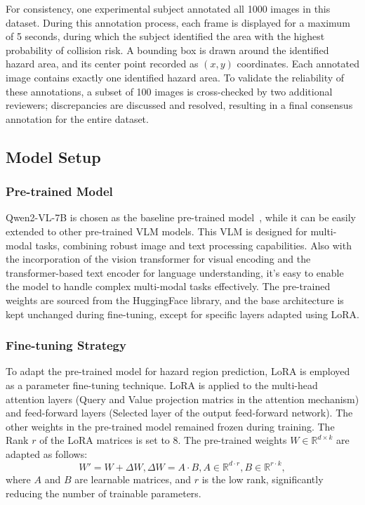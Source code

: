 For consistency, one experimental subject annotated all 1000 images in this dataset. During this annotation process, each frame is displayed for a maximum of 5 seconds, during which the subject identified the area with the highest probability of collision risk. A bounding box is drawn around the identified hazard area, and its center point recorded as $(x, y)$ coordinates. Each annotated image contains exactly one identified hazard area. To validate the reliability of these annotations, a subset of 100 images is cross-checked by two additional reviewers; discrepancies are discussed and resolved, resulting in a final consensus annotation for the entire dataset.

% 



\subsection{Model Setup} 
\subsubsection{Pre-trained Model}
Qwen2-VL-7B is chosen as the baseline pre-trained model~\cite{wang2024qwen2}, while it can be easily extended to other pre-trained VLM models. This VLM is designed for multi-modal tasks, combining robust image and text processing capabilities. Also with the incorporation of the vision transformer for visual encoding and the transformer-based text encoder for language understanding, it's easy to enable the model to handle complex multi-modal tasks effectively. The pre-trained weights are sourced from the HuggingFace library, and the base architecture is kept unchanged during fine-tuning, except for specific layers adapted using LoRA.
\subsubsection{Fine-tuning Strategy}
To adapt the pre-trained model for hazard region prediction, LoRA is employed as a parameter fine-tuning technique. LoRA is applied to the multi-head attention layers (Query and Value projection matrics in the attention mechanism) and feed-forward layers (Selected layer of the output feed-forward network). The other weights in the pre-trained model remained frozen during training. The Rank $r$ of the LoRA matrices is set to 8. The pre-trained weights $W \in \mathbb{R}^{d \times k}$ are adapted as follows:
\begin{equation}
    W' = W + \Delta W, \Delta W = A \cdot B, A \in \mathbb{R}^{d \cdot r}, B \in \mathbb{R}^{r \cdot k},
\end{equation}
where $A$ and $B$ are learnable matrices, and $r$ is the low rank, significantly reducing the number of trainable parameters. 

